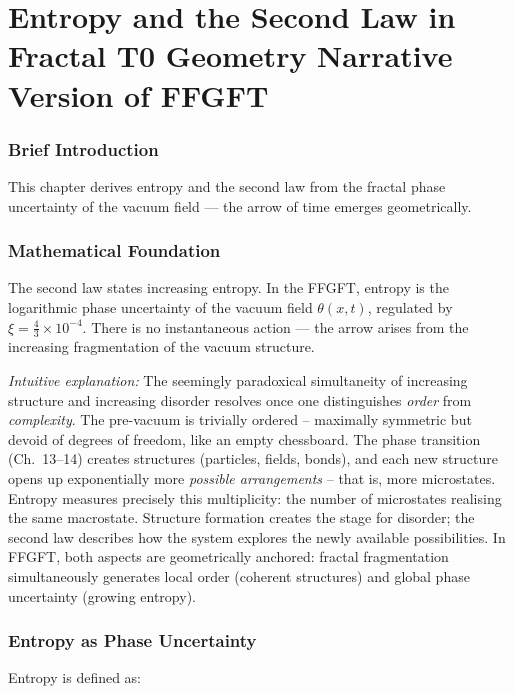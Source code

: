 \chapter{Entropy and the Second Law in Fractal T0 Geometry  Narrative Version of FFGFT}


	
	\subsection*{Brief Introduction}
	
	This chapter derives entropy and the second law from the fractal phase uncertainty of the vacuum field — the arrow of time emerges geometrically.
	
	\subsection*{Mathematical Foundation}
	
	The second law states increasing entropy. In the FFGFT, entropy is the logarithmic phase uncertainty of the vacuum field \(\theta(x,t)\), regulated by \(\xi = \frac{4}{3} \times 10^{-4}\). There is no instantaneous action — the arrow arises from the increasing fragmentation of the vacuum structure.
	
	\textit{Intuitive explanation:} The seemingly paradoxical simultaneity of increasing structure and increasing disorder resolves once one distinguishes \textit{order} from \textit{complexity}. The pre-vacuum is trivially ordered -- maximally symmetric but devoid of degrees of freedom, like an empty chessboard. The phase transition (Ch.~13--14) creates structures (particles, fields, bonds), and each new structure opens up exponentially more \textit{possible arrangements} -- that is, more microstates. Entropy measures precisely this multiplicity: the number of microstates realising the same macrostate. Structure formation creates the stage for disorder; the second law describes how the system explores the newly available possibilities. In FFGFT, both aspects are geometrically anchored: fractal fragmentation simultaneously generates local order (coherent structures) and global phase uncertainty (growing entropy).

	\subsection*{Entropy as Phase Uncertainty}
	
	Entropy is defined as:
	
